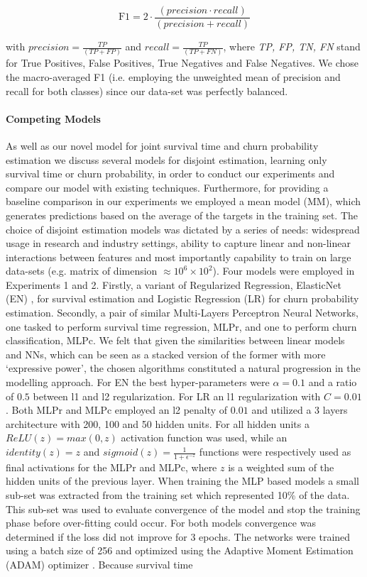 \begin{equation}
\label{f1}
    \text{F1}=
        2 \cdot 
        \dfrac
            {(precision \cdot recall)}
            {(precision + recall)}
\end{equation}

with $precision =\frac {TP}{(TP + FP)}$ and $recall = \frac {TP}{(TP + FN)}$, where \textit{TP, FP, TN, FN} stand for True Positives, False Positives, True Negatives and False Negatives. We chose the macro-averaged F1 (i.e. employing the unweighted mean of precision and recall for both classes) since our data-set was perfectly balanced.

\paragraph*{Competing Models}
As well as our novel model for joint survival time and churn probability estimation we discuss several models for disjoint estimation, learning only survival time or churn probability, in order to conduct our experiments and  compare our model with existing techniques. Furthermore, for providing a baseline comparison in our experiments we employed a mean model (MM), which generates predictions based on the average of the targets in the training set. The choice of disjoint estimation models was dictated by a series of needs: widespread usage in research and industry settings, ability to capture linear and non-linear interactions between features and most importantly capability to train on large data-sets (e.g. matrix of dimension $\approx10^6\times10^2$). Four models were employed in Experiments 1 and 2. Firstly, a variant of Regularized Regression, ElasticNet (EN) \cite{zou2005regularization}, for survival estimation and Logistic Regression (LR) for churn probability estimation. Secondly, a pair of similar Multi-Layers Perceptron Neural Networks, one tasked to perform survival time regression, MLPr, and one to perform churn classification, MLPc. We felt that given the similarities between linear models and NNs, which can be seen as a stacked version of the former with more `expressive power', the chosen algorithms constituted a natural progression in the modelling approach. For EN the best hyper-parameters were $\alpha = 0.1$ and a ratio of $0.5$ between l1 and l2 regularization. For LR an l1 regularization with $C = 0.01$. Both MLPr and MLPc employed an l2 penalty of $0.01$ and utilized a 3 layers architecture with 200, 100 and 50 hidden units. For all hidden units a $ReLU(z) = max(0, z)$ activation function was used, while an  $identity(z) = z$ and $ sigmoid(z) = \frac {1} {1 + \epsilon^{-z}}$ functions were respectively used as final activations for the MLPr and MLPc, where $z$ is a weighted sum of the hidden units of the previous layer. When training the MLP based models a small sub-set was extracted from the training set which represented 10\% of the data. This sub-set was used to evaluate convergence of the model and stop the training phase before over-fitting could occur. For both models convergence was determined if the loss did not improve for 3 epochs. The networks were trained using a batch size of 256 and optimized using the Adaptive Moment Estimation (ADAM) optimizer \cite{kingma2014adam}. Because survival time 